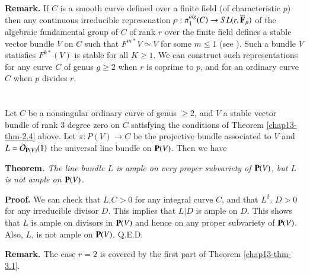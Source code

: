 \medskip
\noindent
{\bfseries Remark.} If $C$ is a smooth curve defined over a finite field (of characteristic $p$) then any continuous irreducible represenation $\rho : \pi_{1}^{alg}(C)\rightarrow SL(r, \overline{\mathbf{F}}_{p})$ of the algebraic fundamental group of $C$ of rank $r$ over the finite field defines a stable vector bundle $V$ on $C$ such that $F^{m*}V \simeq V$ for some $m \leq 1$ (see \cite{chap13-key4}). Such a bundle $V$ statisfies $F^{k*}(V)$ is stable for all $K \geq 1$. We can construct such representations for any curve $C$ of genus $g \geq 2$ when $r$ is coprime to $p$, and for an ordinary curve $C$ when $p$ divides $r$.


\section{}\label{chap13-sec-3}
\pageoriginale
Let $C$ be a nonsingular ordinary curve of genus $\geq 2$, and $V$ a stable vector bundle of rank 3 degree zero on $C$ satisfying the conditions of Theorem \eqref{chap13-thm-2.4} above. Let $\pi : P(V)\rightarrow C$ be the projective bundle associated to $V$ and $L=\mathcal{O}_{\mathbf{P} (V)}(1)$ the universal line bundle on $\mathbf{P}(V)$. Then we have 

\medskip
\noindent
{\bfseries {} Theorem. \label{chap13-thm-3.1}} \textit{The line bundle $L$ is ample on very proper subvariety of $\mathbf{P}(V)$, but $L$ is not ample on $\mathbf{P}(V)$.}

\medskip
\noindent
{\bfseries Proof.} We can check that $L.C > 0$ for any integral curve $C$, and that $L^{2}$. $D >0$ for any irreducible divisor $D$. This implies that $L | D$ is ample on $D$. This shows that $L$ is ample on divisors in $\mathbf{P}(V)$ and hence on any proper subvariety of $\mathbf{P}(V)$. Also, $L$, is not ample on $\mathbf{P}(V)$. \hfill Q.E.D. 

\medskip
\noindent
{\bfseries {} Remark. \label{chap13-thm-3.2}} The case $r=2$ is covered by the first part of Theorem
\eqref{chap13-thm-3.1}.

